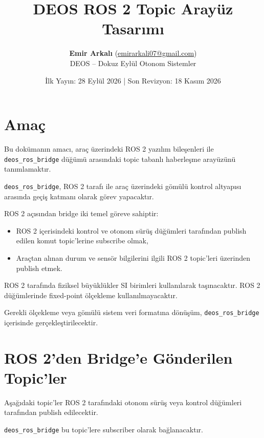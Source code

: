 \documentclass[12pt,a4paper]{article}
\title{
    \textbf{DEOS ROS 2 Topic Arayüz Tasarımı}
}
\author{\textbf{Emir Arkalı} (\href{mailto:emirarkali07@gmail.com}{emirarkali07@gmail.com})\\DEOS -- Dokuz Eylül Otonom Sistemler}
\date{İlk Yayın: 28 Eylül 2026 \quad | \quad Son Revizyon: 18 Kasım 2026}
\begin{document}

\maketitle

\section{Amaç}

Bu dokümanın amacı, araç üzerindeki ROS 2 yazılım bileşenleri ile
\texttt{deos\_ros\_bridge} düğümü arasındaki topic tabanlı haberleşme
arayüzünü tanımlamaktır.

\texttt{deos\_ros\_bridge}, ROS 2 tarafı ile araç üzerindeki gömülü kontrol
altyapısı arasında geçiş katmanı olarak görev yapacaktır.

ROS 2 açısından bridge iki temel göreve sahiptir:

\begin{itemize}
    \item ROS 2 içerisindeki kontrol ve otonom sürüş düğümleri tarafından
    publish edilen komut topic'lerine subscribe olmak,
    
    \item Araçtan alınan durum ve sensör bilgilerini ilgili ROS 2 topic'leri
    üzerinden publish etmek.
\end{itemize}

ROS 2 tarafında fiziksel büyüklükler SI birimleri kullanılarak taşınacaktır.
ROS 2 düğümlerinde fixed-point ölçekleme kullanılmayacaktır.

Gerekli ölçekleme veya gömülü sistem veri formatına dönüşüm,
\texttt{deos\_ros\_bridge} içerisinde gerçekleştirilecektir.

\section{ROS 2'den Bridge'e Gönderilen Topic'ler}

Aşağıdaki topic'ler ROS 2 tarafındaki otonom sürüş veya kontrol düğümleri
tarafından publish edilecektir.

\texttt{deos\_ros\_bridge} bu topic'lere subscriber olarak bağlanacaktır.

\end{document}
